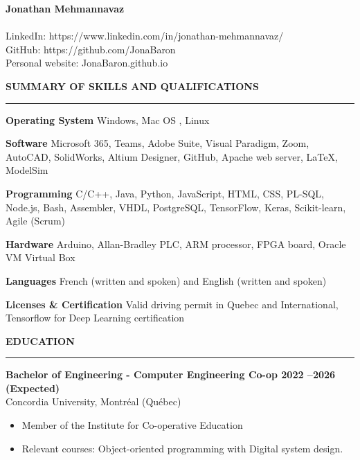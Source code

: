 \documentclass[letterpaper,11pt]{article}
\begin{document}
\begin{center}
{\LARGE\textbf{Jonathan Mehmannavaz}}
\\
\\
LinkedIn: https://www.linkedin.com/in/jonathan-mehmannavaz/
\\
GitHub: https://github.com/JonaBaron
\\
Personal website: JonaBaron.github.io
\end{center}
\textbf{SUMMARY OF SKILLS AND QUALIFICATIONS}
\\
\rule{\textwidth}{0.4pt}
{\small\textbf{Operating System}} \textbar{} Windows, Mac OS , Linux

{\small\textbf{Software}} \textbar{} Microsoft 365, Teams, Adobe Suite, Visual Paradigm, Zoom, AutoCAD, SolidWorks, Altium Designer, GitHub, Apache web server, LaTeX, ModelSim 

{\small\textbf{Programming}} \textbar{} C/C++, Java, Python, JavaScript, HTML, CSS, PL-SQL, Node.js, Bash, Assembler, VHDL, PostgreSQL, TensorFlow, Keras, Scikit-learn, Agile (Scrum)

{\small\textbf{Hardware}} \textbar{} Arduino, Allan-Bradley PLC, ARM processor, FPGA board, Oracle VM Virtual Box

{\small\textbf{Languages}} \textbar{} French (written and spoken) and English
(written and spoken)

{\small\textbf{Licenses \& Certification}} \textbar{} Valid driving permit in
Quebec and International, Tensorflow for Deep Learning certification

\textbf{EDUCATION}
\\
\rule{\textwidth}{0.4pt}
\textbf{Bachelor of Engineering - Computer Engineering Co-op \hfill 2022 --2026 (Expected)}
\\Concordia University, Montréal (Québec)

\begin{itemize}
\setlength{\itemsep}{-3pt}
\item
  Member of the Institute for Co-operative Education
\item
  Relevant courses: Object-oriented programming with Digital system
  design.
\end{itemize}
\end{document}
